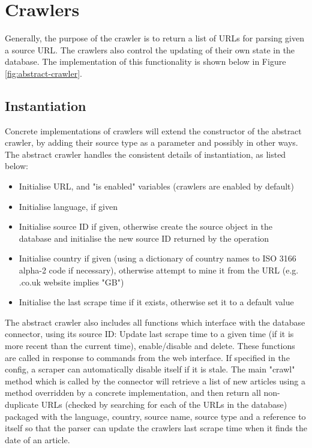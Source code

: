 \documentclass{l4proj}
\begin{document}
\section{Crawlers}
Generally, the purpose of the crawler is to return a list of URLs for parsing given a source URL. The crawlers also control the updating of their own state in the database. The implementation of this functionality is shown below in Figure \ref{fig:abstract-crawler}.
\subsection{Instantiation}
Concrete implementations of crawlers will extend the constructor of the abstract crawler, by adding their source type as a parameter and possibly in other ways. The abstract crawler handles the consistent details of instantiation, as listed below:
\begin{itemize}
    \item Initialise URL, and "is enabled" variables (crawlers are enabled by default)
    \item Initialise language, if given
    \item Initialise source ID if given, otherwise create the source object in the database and initialise the new source ID returned by the operation
    \item Initialise country if given (using a dictionary of country names to ISO 3166 alpha-2 code if necessary), otherwise attempt to mine it from the URL (e.g. .co.uk website implies "GB")
    \item Initialise the last scrape time if it exists, otherwise set it to a default value
\end{itemize}
The abstract crawler also includes all functions which interface with the database connector, using its source ID: Update last scrape time to a given time (if it is more recent than the current time), enable/disable and delete. These functions are called in response to commands from the web interface. If specified in the config, a scraper can automatically disable itself if it is stale. The main "crawl" method which is called by the connector will retrieve a list of new articles using a method overridden by a concrete implementation, and then return all non-duplicate URLs (checked by searching for each of the URLs in the database) packaged with the language, country, source name, source type and a reference to itself so that the parser can update the crawlers last scrape time when it finds the date of an article.
\end{document}
